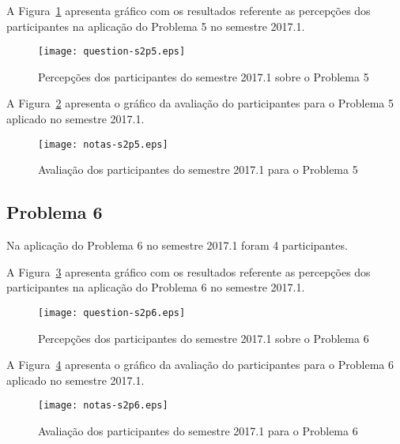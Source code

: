 A Figura~\ref{percep-s2p5} apresenta gráfico com os resultados referente
as percepções dos participantes na aplicação do
Problema 5 no semestre 2017.1.

\begin{figure}[!htb]
\centering
\texttt{[image: question-s2p5.eps]}
\caption{Percepções dos participantes do semestre 2017.1 sobre o Problema 5}
\label{percep-s2p5}
\end{figure}

A Figura~\ref{aval-s2p5} apresenta o gráfico da
avaliação do participantes para o Problema 5 aplicado no semestre 2017.1.

\begin{figure}[!htb]
\centering
\texttt{[image: notas-s2p5.eps]}
\caption{Avaliação dos participantes do semestre 2017.1 para o Problema 5}
\label{aval-s2p5}
\end{figure}

\subsection{Problema 6}
Na aplicação do Problema 6 no semestre 2017.1 foram 4 participantes.

A Figura~\ref{percep-s2p6} apresenta gráfico com os resultados referente
as percepções dos participantes na aplicação do
Problema 6 no semestre 2017.1.

\begin{figure}[!htb]
\centering
\texttt{[image: question-s2p6.eps]}
\caption{Percepções dos participantes do semestre 2017.1 sobre o Problema 6}
\label{percep-s2p6}
\end{figure}

A Figura~\ref{aval-s2p6} apresenta o gráfico da
avaliação do participantes para o Problema 6 aplicado no semestre 2017.1.

\begin{figure}[!htb]
\centering
\texttt{[image: notas-s2p6.eps]}
\caption{Avaliação dos participantes do semestre 2017.1 para o Problema 6}
\label{aval-s2p6}
\end{figure}
